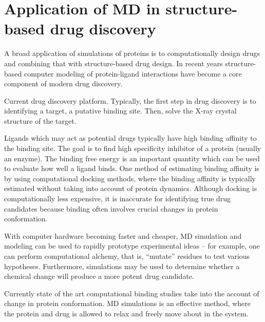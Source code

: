 \section{Application of MD in structure-based drug discovery}
\begin{outline}

	\1 A broad application of simulations of proteins is to computationally design drugs and combining that with structure-based drug design. In recent years structure-based computer modeling of protein-ligand interactions have become a core component of modern drug discovery. 

	\1 Current drug discovery platform. Typically, the first step in drug discovery is to identifying a target, a putative binding site.  Then, solve the X-ray crystal structure of the target.
	
	\1 Ligands which may act as potential drugs typically have high binding affinity to the binding site. The goal is to find high specificity inhibitor of a protein (usually an enzyme). The binding free energy is an important quantity which can be used to evaluate how well a ligand binds. One method of estimating binding affinity is by using computational docking methods, where the binding affinity is typically estimated without taking into account of protein dynamics.  Although docking is computationally less expensive, it is inaccurate for identifying true drug candidates because binding often involves crucial changes in protein conformation.

	\1 With computer hardware becoming faster and cheaper, MD simulation and modeling can be used to rapidly prototype experimental ideas -- for example, one can perform computational alchemy, that is, ``mutate'' residues to test various hypotheses. Furthermore, simulations may be used to determine whether a chemical change will produce a more potent drug candidate.
	
	\1 Currently state of the art computational binding studies take into the account of change in protein conformation. MD simulations is an effective method, where the protein and drug is allowed to relax and freely move about in the system.


\end{outline}
